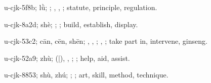 \begin{multicols}{2}
{\cjkgGlue{}u-cjk-5f8b; lǜ; \cjkgGlue{}; \cjkgGlue{}, \cjkgGlue{}, \cjkgGlue{}; statute, principle, regulation.

\cjkgGlue{}u-cjk-8a2d; shè; \cjkgGlue{}\cjkgGlue{}\cjkgGlue{}; \cjkgGlue{}; build, establish, display.

\cjkgGlue{}u-cjk-53c2; cān, cēn, shēn; \cjkgGlue{}\cjkgGlue{}\cjkgGlue{}, \cjkgGlue{}, \cjkgGlue{}; \cjkgGlue{}, \cjkgGlue{}; take part in, intervene, ginseng.

\cjkgGlue{}u-cjk-52a9; zhù; \cjkgGlue{}\cjkgGlue{}(\cjkgGlue{}|\cjkgGlue{}), \cjkgGlue{}\cjkgGlue{}\cjkgGlue{}, \cjkgGlue{}; \cjkgGlue{}; help, aid, assist.

\cjkgGlue{}u-cjk-8853; shù, zhú; \cjkgGlue{}; \cjkgGlue{}; art, skill, method, technique.

}
\end{multicols}
